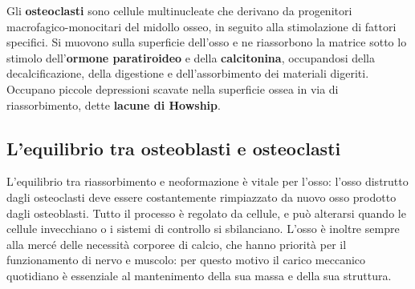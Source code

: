 Gli \textbf{osteoclasti} sono cellule multinucleate che derivano da
progenitori macrofagico-monocitari del midollo osseo, in seguito alla
stimolazione di fattori specifici. Si muovono sulla
superficie dell'osso e ne riassorbono la matrice sotto lo stimolo
dell'\textbf{ormone paratiroideo} e della \textbf{calcitonina}, occupandosi
della decalcificazione, della digestione e dell'assorbimento dei materiali
digeriti. Occupano piccole depressioni scavate nella superficie ossea in via
di riassorbimento, dette \textbf{lacune di Howship}.

\subsection{L'equilibrio tra osteoblasti e osteoclasti}

L'equilibrio tra riassorbimento e neoformazione è vitale per l'osso:
l'osso distrutto dagli osteoclasti deve essere costantemente rimpiazzato da
nuovo osso prodotto dagli osteoblasti. Tutto il processo è regolato da
cellule, e può alterarsi quando le cellule invecchiano o i sistemi di
controllo si sbilanciano. L'osso è inoltre sempre alla mercé delle necessità
corporee di calcio, che hanno priorità per il funzionamento di nervo e
muscolo: per questo motivo il carico meccanico quotidiano è essenziale al
mantenimento della sua massa e della sua struttura.

